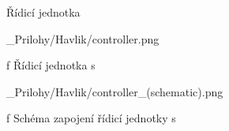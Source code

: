 \app Řídicí jednotka

\medskip {}
\picw=10cm _Prilohy/Havlik/controller.png
\caption/f Řídicí jednotka s 
\medskip

\medskip {}
\picw=15cm _Prilohy/Havlik/controller_(schematic).png
\caption/f Schéma zapojení řídicí jednotky s 
\medskip

\par